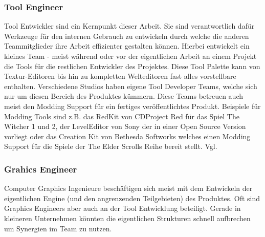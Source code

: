 \documentclass[pagesize, paper=a4, fontsize=12pt, titlepage=true, headings=small, headnosepline, abstractoff, liststotoc, nochapterprefix, plainheadsepline, twoside]{scrreprt}
\begin{document}
\subsubsection{Tool Engineer}
Tool Entwickler sind ein Kernpunkt dieser Arbeit. Sie sind verantwortlich dafür Werkzeuge für den internen Gebrauch zu entwickeln durch welche die anderen Teammitglieder ihre Arbeit effizienter gestalten können. Hierbei entwickelt ein kleines Team - meist während oder vor der eigentlichen Arbeit an einem Projekt die Tools für die restlichen Entwickler des Projektes. Diese Tool Palette kann von Textur-Editoren bis hin zu kompletten Welteditoren fast alles vorstellbare enthalten. Verschiedene Studios haben eigene Tool Developer Teams, welche sich nur um diesen Bereich des Produktes kümmern. Diese Teams betreuen auch meist den Modding Support für ein fertiges veröffentlichtes Produkt. Beispiele für Modding Tools sind z.B. das RedKit von CDProject Red für das Spiel The Witcher 1 und 2, der LevelEditor von Sony der in einer Open Source Version vorliegt oder das Creation Kit von Bethesda Softworks welches einen Modding Support für die Spiele der The Elder Scrolls Reihe bereit stellt. Vgl. \parencite[S. 27 ]{Chandler2006}

\subsubsection{Grahics Engineer}
Computer Graphics Ingenieure beschäftigen sich meist mit dem Entwickeln der eigentlichen Engine (und den angrenzenden Teilgebieten) des Produktes. Oft sind Graphics Engineers aber auch an der Tool Entwicklung beteiligt. Gerade in kleineren Unternehmen könnten die eigentlichen Strukturen schnell aufbrechen um Synergien im Team zu nutzen. \parencite[S. 27 ]{Chandler2006}
\end{document}
